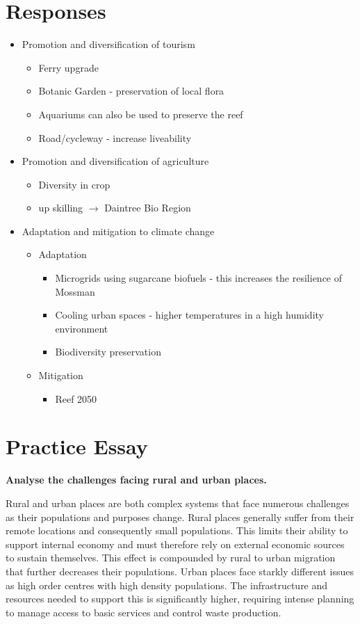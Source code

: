 	\section{Responses}
		\begin{itemize}
			\item Promotion and diversification of tourism
				\begin{itemize}
					\item Ferry upgrade
					\item Botanic Garden - preservation of local flora
					\item Aquariums can also be used to preserve the reef
					\item Road/cycleway - increase liveability
				\end{itemize}
			\item Promotion and diversification of agriculture
				\begin{itemize}
					\item Diversity in crop
					\item up skilling $\rightarrow$ Daintree Bio Region
				\end{itemize}
			\item Adaptation and mitigation to climate change
				\begin{itemize}
					\item Adaptation
						\begin{itemize}
							\item Microgrids using sugarcane biofuels - this increases the resilience of Mossman
							\item Cooling urban spaces - higher temperatures in a high humidity environment
							\item Biodiversity preservation
						\end{itemize}
					\item Mitigation
						\begin{itemize}
							\item Reef 2050
						\end{itemize}
				\end{itemize}
		\end{itemize}
\newpage
\section{Practice Essay} \label{19/03/2025}

	\textbf{Analyse the challenges facing rural and urban places.}

	Rural and urban places are both complex systems that face numerous challenges as their populations and purposes change. Rural places generally suffer from their remote locations and consequently small populations. This limits their ability to support internal economy and must therefore rely on external economic sources to sustain themselves. This effect is compounded by rural to urban migration that further decreases their populations. Urban places face starkly different issues as high order centres with high density populations. The infrastructure and resources needed to support this is significantly higher, requiring intense planning to manage access to basic services and control waste production.
	
